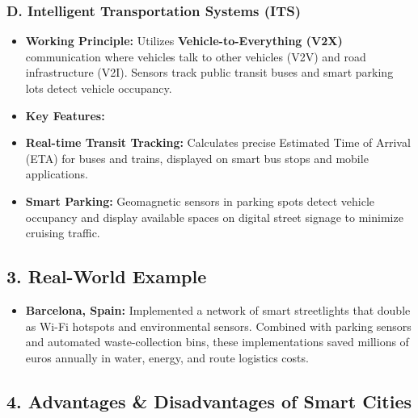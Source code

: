 \subsubsection{D. Intelligent Transportation Systems (ITS)}
\begin{itemize}
  \item   \textbf{Working Principle:} Utilizes \textbf{Vehicle-to-Everything (V2X)} communication where vehicles talk to other vehicles (V2V) and road infrastructure (V2I). Sensors track public transit buses and smart parking lots detect vehicle occupancy.
  \item   \textbf{Key Features:}
  \item   \textbf{Real-time Transit Tracking:} Calculates precise Estimated Time of Arrival (ETA) for buses and trains, displayed on smart bus stops and mobile applications.
  \item   \textbf{Smart Parking:} Geomagnetic sensors in parking spots detect vehicle occupancy and display available spaces on digital street signage to minimize cruising traffic.
\end{itemize}


\subsection{3. Real-World Example}
\begin{itemize}
  \item   \textbf{Barcelona, Spain:} Implemented a network of smart streetlights that double as Wi-Fi hotspots and environmental sensors. Combined with parking sensors and automated waste-collection bins, these implementations saved millions of euros annually in water, energy, and route logistics costs.
\end{itemize}


\subsection{4. Advantages \& Disadvantages of Smart Cities}


